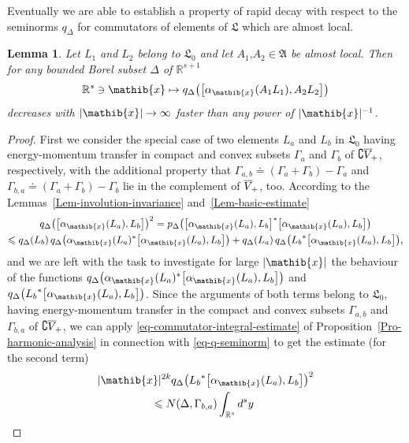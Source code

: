 \documentclass[11pt,twoside,openright]{report}
\theoremstyle{definition}
\theoremstyle{plain}
\newtheorem{Lem}[Def]{Lemma}
\theoremstyle{remark}
\theoremstyle{assumption}
\newcommand{\bcomm}[2]{\bigl[ #1 , #2 \bigr]}
\newcommand{\abs}[1]{\lvert #1 \rvert}
\newcommand{\bpDx}[1]{p_\Delta \bigl( #1 \bigr)}
\newcommand{\qD}{q_\Delta}
\newcommand{\qDx}[1]{q_\Delta ( #1 )}
\newcommand{\bqDx}[1]{q_\Delta \bigl( #1 \bigr)}
\newcommand{\Afrak}{\mathfrak{A}}
\newcommand{\Lfrak}{\mathfrak{L}}
\newcommand{\xib}{\mathib{x}}
\newcommand{\Rs}{\mathbb{R}^s}
\newcommand{\Rsone}{\mathbb{R}^{s + 1}}
\newcommand{\fwcone}{\overline{V}_{\negthinspace +}}
\newcommand{\aibx}{\alpha_\mathib{x}}
\begin{document}
Eventually we are able to establish a property of rapid decay with
respect to the seminorms $\qD$ for commutators of elements of $\Lfrak$
which are almost local.
\begin{Lem}
  \label{Lem-commutator-qd-decay}
  Let $L_1$ and $L_2$ belong to $\Lfrak_0$ and let $A_1 \text{,} A_2
  \in \Afrak$ be almost local. Then for any bounded Borel subset
  $\Delta$ of $\Rsone$
  \begin{equation*}
    \Rs \ni \xib \mapsto \bqDx{\bcomm{\aibx ( A_1 L_1 )}{A_2 L_2}}
  \end{equation*}
  decreases with $\abs{\xib} \rightarrow \infty$ faster than any power
  of $\abs{\xib}^{-1}$.
\end{Lem}
\begin{proof}
  First we consider the special case of two elements $L_a$ and $L_b$
  in $\Lfrak_0$ having energy-momentum transfer in compact and convex
  subsets $\Gamma_a$ and $\Gamma_b$ of $\complement \fwcone$,
  respectively, with the additional property that $\Gamma_{a , b}
  \doteq  ( \Gamma_a + \Gamma_b ) - \Gamma_a$ and $\Gamma_{b , a}
  \doteq ( \Gamma_a + \Gamma_b ) - \Gamma_b$ lie in the complement of
  $\fwcone$, too. According to the
  Lemmas~\ref{Lem-involution-invariance} and~\ref{Lem-basic-estimate}
  \begin{multline}
    \label{eq-specialized-Ep-transfer-estimate}
    \bqDx{\bcomm{\aibx ( L_a )}{L_b}}^2 = \bpDx{\bcomm{\aibx ( L_a
    )}{L_b}^* \bcomm{\aibx ( L_a )}{L_b}} \\
    \leqslant \qDx{L_b} \, \bqDx{\aibx ( L_a )^* \bcomm{\aibx ( L_a
    )}{L_b}} + \qDx{L_a} \, \bqDx{{L_b}^* \bcomm{\aibx ( L_a )}{L_b}}
    \text{,}
  \end{multline}
  and we are left with the task to investigate for large $\abs{\xib}$
  the behaviour of the functions $\bqDx{\aibx ( L_a )^* \bcomm{\aibx (
  L_a )}{L_b}}$ and $\bqDx{{L_b}^* \bcomm{\aibx ( L_a )}{L_b}}$. Since
  the arguments of both terms belong to $\Lfrak_0$, having
  energy-momentum transfer in the compact and convex subsets
  $\Gamma_{a , b}$ and $\Gamma_{ b , a}$ of $\complement \fwcone$, we
  can apply \eqref{eq-commutator-integral-estimate} of
  Proposition~\ref{Pro-harmonic-analysis} in connection with
  \eqref{eq-q-seminorm} to get the estimate (for the second term)
  \begin{multline}
    \label{eq-L0-commutator-estimate}
    \abs{\xib}^{2k} \bqDx{{L_b}^* \bcomm{\aibx ( L_a )}{L_b}}^2 \\
    \leqslant N ( \Delta , \Gamma_{b , a} ) \int_{\Rs} d^s y \;

\end{multline}
\end{proof}
\end{document}
